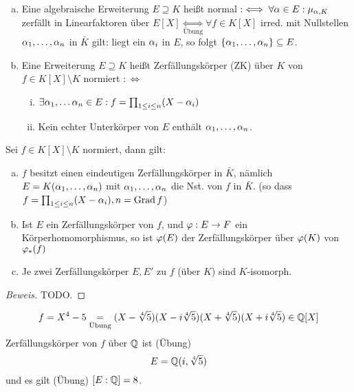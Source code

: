 \documentclass[a4paper]{report}
\begin{document}
\begin{defi}
  \begin{enumerate}[(a)]
    \item Eine algebraische Erweiterung $E \supseteq K$ heißt normal $:\iff \forall \alpha \in E: \mu_{\alpha, K}$ zerfällt in Linearfaktoren über $E[X] \underset{\text{Übung}} \iff \forall f \in K[X]$ irred. mit Nullstellen $\alpha_{1}, \ldots, \alpha_{n}$ in $\bar K$ gilt: liegt ein $\alpha_{i}$ in $E$, so folgt $\{\alpha_{1}, \ldots, \alpha_{n}\} \subseteq E$.
    \item Eine Erweiterung $E \supseteq K$ heißt Zerfällungskörper (ZK) über $K$  von $f \in K[X] \setminus K$ normiert $: \iff$
          \begin{enumerate}[(i)]
            \item $\exists \alpha_{1}, \ldots \alpha_{n} \in E : f = \prod_{1 \le i \le n}(X-\alpha_{i})$
            \item Kein echter Unterkörper von $E$ enthält $\alpha_{1}, \ldots, \alpha_{n}$.
          \end{enumerate}
  \end{enumerate}
\end{defi}


\begin{prop}
  Sei $f \in K[X] \setminus K$ normiert, dann gilt:
  \begin{enumerate}[(a)]
    \item $f$ besitzt einen eindeutigen Zerfällungskörper in $\bar K$, nämlich $E = K(\alpha_{1}, \ldots, \alpha_{n})$ mit $\alpha_{1}, \ldots, \alpha_{n}$ die Nst. von $f$ in $\bar K$. (so dass $f = \prod_{1 \le i \le n}(X - \alpha_{i}), n = \operatorname{Grad} f$)
    \item Ist $E$ ein Zerfällungskörper von $f$, und $\varphi : E \to F$ ein Körperhomomorphismus, so ist $\varphi(E)$ der Zerfällungskörper über $\varphi(K)$ von $\varphi_{*}(f)$
    \item Je zwei Zerfällungskörper $E, E'$ zu $f$ (über $K$) sind $K$-isomorph.
  \end{enumerate}
\begin{proof}[Beweis]
TODO.
\end{proof}
\end{prop}

\begin{bsp}
  \[f = X^{4} - 5 \underset{\text{Übung}} = (X - \sqrt[4]5)(X - i\sqrt[4]5)(X + \sqrt[4]5)(X + i\sqrt[4]5)\in \mathbb{Q}[X]\]
  Zerfällungskörper von $f$ über $\mathbb{Q}$ ist (Übung)
  \[E = \mathbb{Q}(i, \sqrt[4] 5)\]
  und es gilt (Übung) $[E : \mathbb{Q}] = 8$.
\end{bsp}
\end{document}
